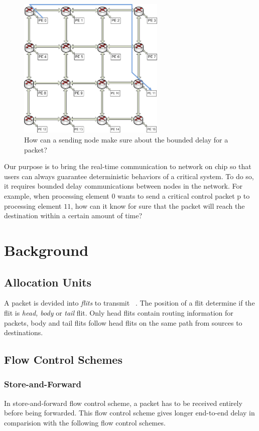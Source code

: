 \documentclass[conference, twocolumn]{IEEEtran}
\theoremstyle{definition}
\begin{document}
\begin{figure}[htp]
\centering
\includegraphics[width=7cm]{pics/NoC0}
\caption[Demand for a hard real-time flow.]
{How can a sending node make sure about the bounded delay for
a packet?}\label{fig:NoCRt}
\end{figure}

Our purpose is to bring the real-time communication to network on chip so that 
users can always guarantee deterministic behaviors of a critical system. To do 
so, it requires bounded delay communications between nodes in the network. 
For example, when processing element $0$ wants to send a critical control packet 
p to processing element $11$, how can it know for sure that the packet will
reach the destination within a certain amount of time? 
\section{Background}
\subsection{Allocation Units}
A packet is devided into {\em flits} to transmit ~\cite{DallyPrinNetwork}. The
position of a flit determine if the flit is {\em head, body} or {\em tail}
flit. Only head flits contain routing information for packets, body and tail
flits follow head flits on the same path from sources to destinations.
\subsection{Flow Control Schemes}
\subsubsection{Store-and-Forward}
In store-and-forward flow control scheme, a packet has to be received entirely
before being forwarded. This flow control scheme gives longer end-to-end delay
in comparision with the following flow control schemes.
\end{document}
